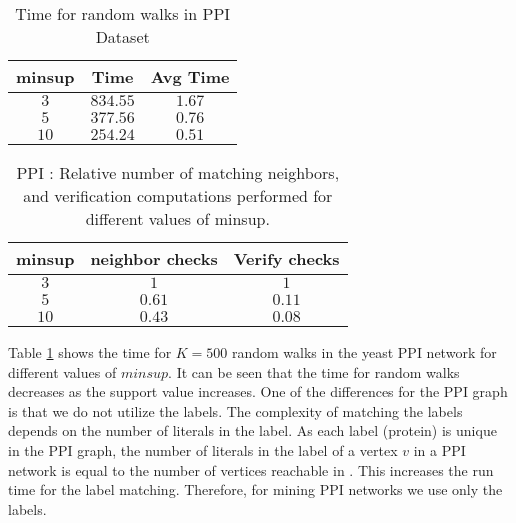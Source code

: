 \begin{table}[!h]
\centering
\begin{tabular}{|c|c|c|}
        \hline
        minsup & Time & Avg Time \\
		\hline
        $3$ & $834.55$ & $1.67$ \\
        $5$ & $377.56$ & $0.76$ \\
        $10$ & $254.24$ & $0.51$ \\
		\hline
    \end{tabular}
    \caption{Time for random walks in PPI Dataset }
\label{tab:ppi}
\end{table}

\begin{table}[!h]
\centering
\begin{tabular}{|c|c|c|}
	\hline
	minsup & neighbor checks & Verify checks \\
	\hline
	$3$ & $1$ & $1$ \\ 
	$5$ & $0.61$ & $0.11$ \\
	$10$ & $0.43$ & $0.08$ \\
	\hline
	\end{tabular}
	\caption{PPI : Relative number of matching neighbors, and verification computations performed
	for different values of minsup.}
	\label{tab:ppi_relative}
	\end{table}

\smallskip{} Table \ref{tab:ppi} shows the
time for $K=500$ random walks in the yeast PPI network for different
values of $minsup$.  It can be seen that the time for random walks
decreases as the support value increases.  One of the differences for
the PPI graph is that we do not utilize the \khop labels.  The
complexity of matching the \khop labels depends on the number of
literals in the \khop label.  As each label (protein) is unique in the
PPI graph, the number of literals in the \khop label of a vertex $v$ in
a PPI network is equal to the number of vertices reachable in \khops.
This increases the run time for the \khop label matching.  Therefore,
for mining PPI networks we use only the \ncl labels.


